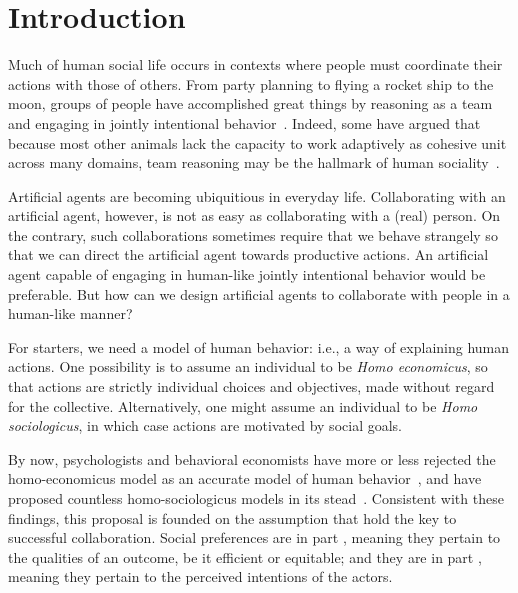 
\section{Introduction}
\label{sec:intro}

Much of human social life occurs in contexts where people must
coordinate their actions with those of others.  From party planning to
flying a rocket ship to the moon, groups of people have accomplished
great things by reasoning as a team and engaging in jointly
intentional behavior~\cite{searle1995construction}.  Indeed, some have
argued that because most other animals lack the capacity to work
adaptively as cohesive unit across many domains, team reasoning may be
the hallmark of human sociality~\cite{tomasello2005understanding}.


Artificial agents are becoming ubiquitious in everyday life.
Collaborating with an artificial agent, however, is not as easy as
collaborating with a (real) person.  On the contrary, such
collaborations sometimes require that we behave strangely  so that we
can direct the artificial agent towards productive actions.  An
artificial agent capable of engaging in human-like jointly intentional
behavior 
would be preferable.  But how can we design artificial agents to
collaborate with people in a human-like manner?

For starters, we need a model of human behavior: i.e., a way of
explaining human actions.  One possibility is to assume an individual
to be \emph{Homo economicus}, so that actions are strictly individual
choices and objectives, made without regard for the collective.
Alternatively, one might assume an individual to be \emph{Homo
  sociologicus}, in which case actions are motivated by social goals.

By now, psychologists and behavioral economists have more or less
rejected the homo-economicus model as an accurate model of human
behavior~\cite{Kahnemann, etc.}, and have proposed countless
homo-sociologicus models in its stead~\cite{ADD CITATIONS}.
%
Consistent with these findings, this proposal is founded on the
assumption that  hold the key to successful
collaboration.
%
Social preferences are in part , meaning they
pertain to the qualities of an outcome, be it efficient or equitable;
and they are in part , meaning they pertain to the
perceived intentions of the actors.

